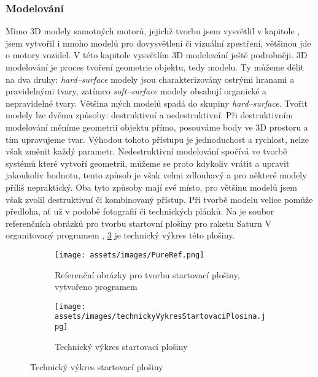 \subsubsection{Modelování}
{Mimo 3D modely samotných motorů, jejichž tvorbu jsem vysvětlil v kapitole , jsem vytvořil i mnoho modelů pro dovysvětlení či vizuální zpestření, většinou jde o motory vozidel. V této kapitole vysvětlím 3D modelování ještě podrobněji.}\odst
{3D modelování je proces tvoření geometrie objektu, tedy modelu. Ty můžeme dělit na dva druhy: \textit{hard--surface} modely jsou charakterizovány ostrými hranami a pravidelnými tvary, zatímco \textit{soft--surface} modely obsahují organické a nepravidelné tvary. Většina mých modelů spadá do skupiny \textit{hard--surface}.}\odst
{Tvořit modely lze dvěma způsoby: destruktivní a nedestruktivní. Při destruktivním modelování měníme geometrii objektu přímo, posouváme body ve 3D prostoru a tím upravujeme tvar. Výhodou tohoto přístupu je jednoduchost a rychlost, nelze však změnit každý parametr. Nedestruktivní modelování spočívá ve tvorbě systémů které vytvoří geometrii, můžeme se proto kdykoliv vrátit a upravit jakoukoliv hodnotu, tento způsob je však velmi zdlouhavý a pro některé modely příliš nepraktický. Oba tyto způsoby mají své místo, pro většinu modelů jsem však zvolil destruktivní či kombinovaný přístup.}\odst
{Při tvorbě modelu velice pomůže předloha, ať už v podobě fotografií či technických plánků. Na  je soubor referenčních obrázků pro tvorbu startovní plošiny pro raketu Saturn V organitovaný programem , \ref{obr:predlohaVykres} je technický výkres této plošiny.}

\begin{figure}[H]
    \centering
    \begin{subfigure}{.7\textwidth}
        \centering
        \texttt{[image: assets/images/PureRef.png]}
        \caption{Referenční obrázky pro tvorbu startovací plošiny, \\vytvořeno programem }
        \label{obr:predlohaFotky}
    \end{subfigure}%
    \begin{subfigure}{.3\textwidth}
        \centering
        \texttt{[image: assets/images/technickyVykresStartovaciPlosina.jpg]}
        \caption{Technický výkres startovací plošiny}
        \label{obr:predlohaVykres}
    \end{subfigure}
\end{figure}


